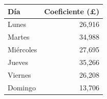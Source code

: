 \begin{tabular}{lr}
\toprule
Día & Coeficiente (\pounds) \\
\midrule
Lunes & 26,916 \\
Martes & 34,988 \\
Miércoles & 27,695 \\
Jueves & 35,266 \\
Viernes & 26,208 \\
Domingo & 13,706 \\
\bottomrule
\end{tabular}
